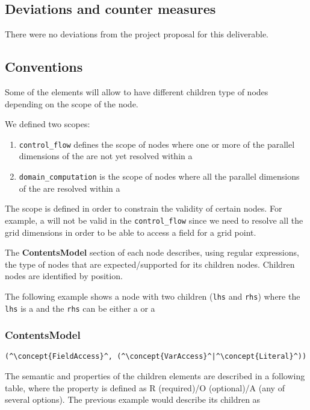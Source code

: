 \subsection{Deviations and counter measures} 
There were no deviations from the project proposal for this deliverable.
\subsection{Conventions}

Some of the elements will allow to have different children type of nodes depending on the scope of the node.

We defined two scopes: 
\begin{enumerate}
	\item {\tt control\_flow} defines the scope of nodes where one or more of the parallel dimensions of the  are not yet resolved within a 
	\item {\tt domain\_computation} is the scope of nodes where all the parallel dimensions of the  are resolved within a 
\end{enumerate}

The scope is defined in order to constrain the validity of certain nodes.
For example, a  will not be valid in the 
{\tt control\_flow} since we need to resolve all the grid dimensions
in order to be able to access a field for a grid point.


The {\bf ContentsModel} section of each node describes, using regular expressions, the type of nodes that are expected/supported for its children nodes. 
Children nodes are identified by position. 

The following example shows
a node with two children ({\tt lhs} and {\tt rhs}) where 
the {\tt lhs} is a  and the {\tt rhs} can be either a  or a  

\subsubsection*{ContentsModel}{}

\begin{lstlisting}[style=default,frame=none]
(^\concept{FieldAccess}^, (^\concept{VarAccess}^|^\concept{Literal}^))
\end{lstlisting}

The semantic and properties of the children elements are 
described in a following table, where the property is defined 
as R (required)/O (optional)/A (any of several options).
The previous example would describe its children as 

